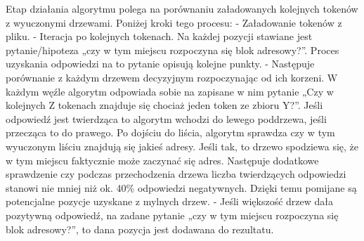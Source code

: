\documentclass[a4paper,oneside,12pt]{article}
\begin{document}
Etap działania algorytmu polega na porównaniu załadowanych kolejnych tokenów z wyuczonymi drzewami. Poniżej kroki tego procesu:
-	Załadowanie tokenów z pliku.
-	Iteracja po kolejnych tokenach. Na każdej pozycji stawiane jest pytanie/hipoteza „czy w tym miejscu rozpoczyna się blok adresowy?”. Proces uzyskania odpowiedzi na to pytanie opisują kolejne punkty.
-	Następuje porównanie z każdym drzewem decyzyjnym rozpoczynając od ich korzeni. W każdym węźle  algorytm odpowiada sobie na zapisane w nim pytanie „Czy w kolejnych Z tokenach znajduje się chociaż jeden token ze zbioru Y?”. Jeśli odpowiedź jest twierdząca to algorytm wchodzi do lewego poddrzewa, jeśli przecząca to do prawego. Po dojściu do liścia, algorytm sprawdza czy w tym wyuczonym liściu znajdują się jakieś adresy. Jeśli tak, to drzewo spodziewa się, że w tym miejscu faktycznie może zaczynać się adres. Następuje dodatkowe sprawdzenie czy podczas przechodzenia drzewa liczba twierdzących odpowiedzi stanowi nie mniej niż ok. 40\% odpowiedzi negatywnych. Dzięki temu pomijane są potencjalne pozycje uzyskane z  mylnych drzew.
-	Jeśli większość drzew dała pozytywną odpowiedź, na zadane pytanie „czy w tym miejscu rozpoczyna się blok adresowy?”, to dana pozycja jest dodawana do rezultatu.
\end{document}
